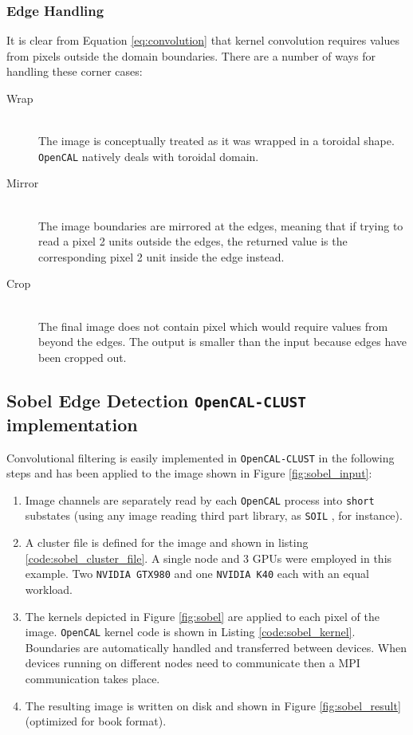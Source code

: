 \subsubsection{Edge Handling}
It is clear from Equation \ref{eq:convolution} that kernel convolution requires values from pixels outside the domain boundaries. There are a number of ways for handling these corner cases:
\begin{description}
    \item[Wrap] \hfill \\The image is conceptually treated as it was wrapped in a toroidal shape. \texttt{OpenCAL} natively deals with toroidal domain.
    \item[Mirror] \hfill \\
    The image boundaries are mirrored at the edges, meaning that if trying to read a pixel 2 units outside the edges, the returned value is the corresponding pixel 2 unit inside the edge instead.
    \item [Crop]\hfill \\
    The final image does not contain pixel which would require values from beyond the edges. The output is smaller than the input because edges have been cropped out.
\end{description}

\subsection{Sobel Edge Detection \texttt{OpenCAL-CLUST} implementation}
\label{sec:convolutional_filters_example}
Convolutional filtering is easily implemented in \texttt{OpenCAL-CLUST} in the following steps and has been applied to the image shown in Figure \ref{fig:sobel_input}:
\begin{enumerate}
    \item Image channels are separately read by each \texttt{OpenCAL} process into \texttt{short} substates (using any image reading third part library, as \texttt{SOIL} \cite{SOIL}, for instance).
    \item A cluster file is defined for the image and shown in listing \ref{code:sobel_cluster_file}. A single node and 3 GPUs were employed in this example. Two \texttt{NVIDIA GTX980} and one \texttt{NVIDIA K40} each with an equal workload.
    \item The kernels depicted in Figure \ref{fig:sobel} are applied to each pixel of the image. \texttt{OpenCAL} kernel code is shown in Listing \ref{code:sobel_kernel}.  Boundaries are automatically handled and transferred  between devices. When devices running on different nodes need to communicate then a MPI communication takes place.
    \item The resulting image is written on disk and  shown in Figure \ref{fig:sobel_result} (optimized for book format).
\end{enumerate}

